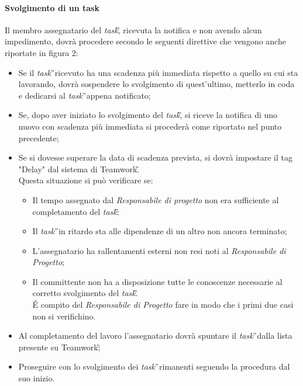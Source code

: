 \paragraph{Svolgimento di un task}
Il membro assegnatario del \textit{task}\G, ricevuta la notifica e non avendo alcun impedimento, dovrà procedere secondo le seguenti direttive che vengono anche riportate in figura 2:
\begin{itemize}
\item Se il \textit{task}\G\ ricevuto ha una scadenza più immediata rispetto a quello su cui sta lavorando, dovrà sospendere lo svolgimento di quest'ultimo, metterlo in coda e dedicarsi al \textit{task}\G\ appena notificato;
\item Se, dopo aver iniziato lo svolgimento del \textit{task}\G, si riceve la notifica di uno nuovo con scadenza più immediata si procederà come riportato nel punto precedente;
\item Se si dovesse superare la data di scadenza prevista, si dovrà impostare il tag "Delay" dal sistema di Teamwork\G.\\
Questa situazione si può verificare se:
\begin{itemize}
\item Il tempo assegnato dal \textit{Responsabile di progetto} non era sufficiente al completamento del \textit{task}\G;
\item Il \textit{task}\G\ in ritardo sta alle dipendenze di un altro non ancora terminato;
\item L'assegnatario ha rallentamenti esterni non resi noti al \textit{Responsabile di Progetto};
\item Il committente non ha a disposizione tutte le conoscenze necessarie al corretto svolgimento del \textit{task}\G.\\
\'E compito del \textit{Responsabile di Progetto} fare in modo che i primi due casi non si verifichino.
\end{itemize}
\item Al completamento del lavoro l'assegnatario dovrà spuntare il \textit{task}\G\ dalla lista presente su Teamwork\G;
\item Proseguire con lo svolgimento dei \textit{task}\G\ rimanenti seguendo la procedura dal suo inizio.
\end{itemize}

